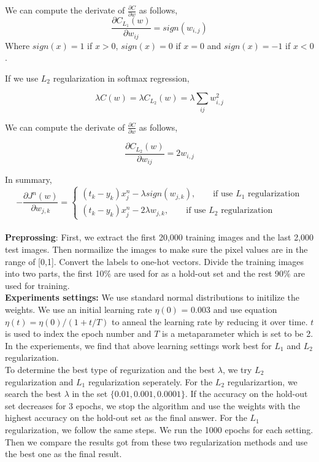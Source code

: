 \documentclass{article} %
\begin{document}
We can compute the derivate of $\frac{\partial C}{\partial w}$ as follows,
\begin{equation}
	\frac{\partial C_{L_1}(w)}{\partial w_{ij}} = sign(w_{i,j})
\end{equation}
Where $sign(x) = 1$ if $x > 0$, $sign(x) = 0$ if $x = 0$ and $sign(x) = -1$ if $x < 0$.

If we use $L_2$ regularization in softmax regression,

\begin{equation}
\lambda C(w) = \lambda C_{L_2}(w) =   \lambda \sum_{ij}w_{i,j}^2
\end{equation}

We can compute the derivate of $\frac{\partial C}{\partial w}$ as follows,

\begin{equation}
\frac{\partial C_{L_2}(w)}{\partial w_{ij}} = 2w_{i,j}
\end{equation}

In summary, 
  \[
-\frac{\partial J^n(w)}{\partial w_{j,k}} =\left\{
\begin{array}{ll}
(t_k - y_k)x_j^n - \lambda sign(w_{j,k}),\qquad \text{if use $L_1$ regularization} \\
(t_k - y_k)x_j^n - 2\lambda w_{j,k}, \qquad \text{if use $L_2$ regularization}
\end{array}
\right.
\]
\\

\textbf{Preprossing}: First, we extract the first 20,000 training images and the last 2,000 test images. Then normailize the images to make sure the pixel values are in the range of [0,1]. Convert the labels to one-hot vectors. Divide the training images into two parts, the first 10\% are used for as a hold-out set and the rest 90\% are used for training.
\\

\textbf{Experiments settings:} We use standard normal distributions to initilize the weights. We use an initial learning rate $\eta({0})$ = 0.003 and use equation $\eta({t}) = \eta{(0)}/(1+t/T)$ to anneal the learning rate by reducing it over time. $t$ is used to index the epoch number and $T$ is a metaparameter which is set to be 2. In the
experiements, we find that above learning settings work best for $L_1$ and $L_2$ regularization. 
\\

To determine the best type of regurization and the best $\lambda$, we try $L_2$ regularization and $L_1$ regularization seperately. For the $L_2$ regularizartion, we search the best $\lambda$ in the set $\{0.01, 0.001, 0.0001\}$. If the accuracy on the hold-out set decreases for 3 epochs, we stop the algorithm and use the weights with the highest accuracy on the hold-out set as the final answer. For the $L_1$ regularization, we follow the same steps. We run the 1000 epochs for each setting. \textbf{}Then we compare the results got from these two regularization methods and use the best one as the final result.
 
\end{document}
